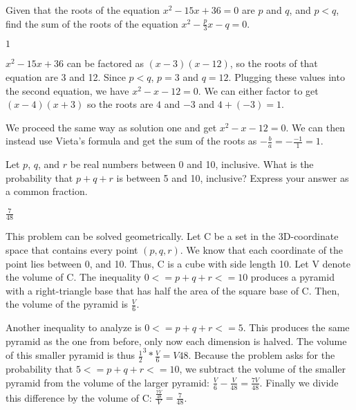 \documentclass[11pt]{article}
\begin{document}
\begin{problem} Given that the roots of the equation $x^2 - 15x + 36 = 0$ are $p$ and $q$, and $p<q$, find the sum of the roots of the equation $x^2 - \frac{p}{3}x - q = 0$.
\end{problem}
\begin{answer}
$\boxed{1}$
\end{answer}
\begin{solutionone}
$x^2 - 15x + 36$ can be factored as $(x-3)(x-12)$, so the roots of that equation are 3 and 12. Since $p<q$, $p=3$ and $q=12$. Plugging these values into the second equation, we have $x^2 - x - 12 = 0$. We can either factor to get $(x-4)(x+3)$ so the roots are $4$ and $-3$ and $4 + (-3) = \boxed{1}$.
\end{solutionone}
\begin{solutiontwo}
We proceed the same way as solution one and get $x^2 - x - 12 = 0$. We can then instead use Vieta's formula and get the sum of the roots as $-\frac{b}{a} = -\frac{-1}{1} = \boxed{1}$.
\end{solutiontwo}

\begin{problem}
Let $p$, $q$, and $r$ be real numbers between 0 and 10, inclusive. What is the probability that $p + q + r$ is between 5 and 10, inclusive? Express your answer as a common fraction.
\end{problem}
\begin{answer}
$\boxed{\frac{7}{48}}$
\end{answer}
\begin{solution}
This problem can be solved geometrically. Let C be a set in the 3D-coordinate space that contains every point $(p, q, r)$. We know that each coordinate of the point lies between 0, and 10. Thus, C is a cube with side length 10. Let V denote the volume of C. The inequality $0 <= p + q + r <= 10$ produces a pyramid with a right-triangle base that has half the area of the square base of C. Then, the volume of the pyramid is $\frac{V}{6}$.

Another inequality to analyze is $0 <= p + q + r <= 5$. This produces the same pyramid as the one from before, only now each dimension is halved. The volume of this smaller pyramid is thus ${\frac{1}{2}}^3 * \frac{V}{6} = {V}{48}$. Because the problem asks for the probability that $5 <= p + q + r <= 10$, we subtract the volume of the smaller pyramid from the volume of the larger pyramid: $\frac{V}{6} - \frac{V}{48} = \frac{7V}{48}$. Finally we divide this difference by the volume of C: $\frac{\frac{7V}{48}}{V} = \boxed{\frac{7}{48}}$.
\end{solution}
\end{document}
